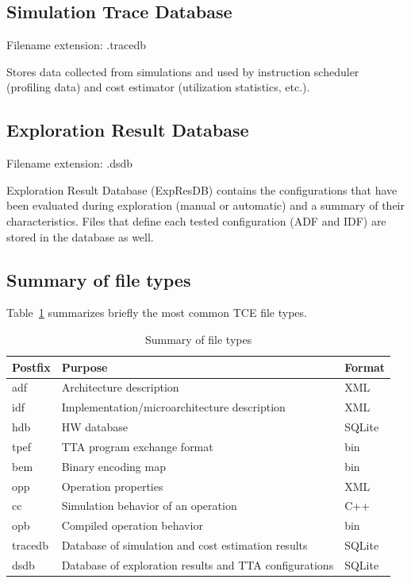 \documentclass[twoside]{tceusermanual}
\begin{document}
\subsection{Simulation Trace Database}
\label{sec:tracedb}

Filename extension: .tracedb

Stores data collected from simulations and used by instruction scheduler
(profiling data) and cost estimator (utilization statistics, etc.).

\subsection{Exploration Result Database}
\label{sec:expresdb}

Filename extension: .dsdb

Exploration Result Database (ExpResDB) contains the configurations that have
been evaluated during exploration (manual or automatic) and a summary of
their characteristics. Files that define each tested configuration (ADF and
IDF) are stored in the database as well. 



\subsection{Summary of file types}
\label{sec:summary}

Table~\ref{tab:files} summarizes briefly the most common TCE file types.

\begin{table}[b]
  \begin{center}
    \caption {Summary of file types}
    \label {tab:files}
    \begin{tabular}{l | l | l }
      \hline
      Postfix  & Purpose                                    & Format \\
      \hline
      \hline
      adf      & Architecture description                 & XML \\
      idf      & Implementation/microarchitecture description & XML \\
      hdb      & HW database                                & SQLite \\
      \hline
      tpef     & TTA program exchange format                & bin \\
      bem      & Binary encoding map                        & bin \\
      opp      & Operation properties                       & XML \\
      cc       & Simulation behavior of an operation                   & C++\\
      opb      & Compiled operation behavior                & bin \\
      \hline
      tracedb  & Database of simulation and cost estimation results     & SQLite \\
      dsdb     & Database of exploration results and TTA configurations & SQLite \\
      \hline
    \end{tabular}
  \end{center}
\end{table}
\end{document}
